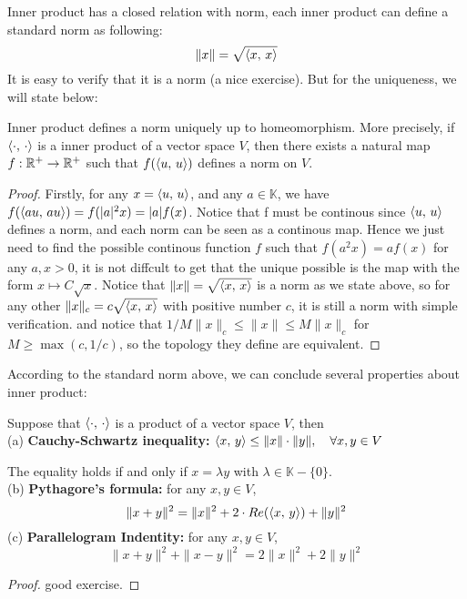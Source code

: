 \documentclass[en,geye,blue,normal,12pt,bibend=bibtex]{elegantnote}
\begin{document}
Inner product has a closed relation with norm, each inner product can define a standard norm as following:
\[\|x\| = \sqrt{\left\langle x,\, x \right\rangle}\]
It is easy to verify that it is a norm (a nice exercise). But for the uniqueness, we will state below:
\begin{proposition}
    Inner product defines a norm uniquely up to homeomorphism. More precisely, if \(\left\langle \cdot,\, \cdot \right\rangle\) is a inner product of a vector space \(V\), then there exists a natural map \(f: \mathbb{R}^+ \to \mathbb{R}^+\) such that \(f(\left\langle u,\, u \right\rangle)\) defines a norm on \(V\).

    \begin{proof}
        Firstly, for any \(x = \left\langle u,\, u \right\rangle\), and any \(a \in \mathbb{K}\), we have \(f(\left\langle au,\, au \right\rangle) = f(|a|^2x) = |a|f(x)\). Notice that f must be continous since \(\left\langle u,\, u \right\rangle\) defines a norm, and each norm can be seen as a continous map. Hence we just need to find the possible continous function \(f\) such that \(f(a^2x)=af(x)\) for any \(a,x >0\), it is not diffcult to get that the unique possible is the map with the form \(x \mapsto C\sqrt{x}\). Notice that \(\|x\| = \sqrt{\left\langle x,\, x \right\rangle}\) is a norm as we state above, so for any other \(\|x\|_c = c\sqrt{\left\langle x,\, x \right\rangle}\) with positive number \(c\), it is still a norm with simple verification. and notice that \(1/M \|x\|_c \leq \|x\| \leq M\|x\|_c\) for \(M \geq \max(c,1/c)\), so the topology they define are equivalent.
    \end{proof}
\end{proposition}

According to the standard norm above, we can conclude several properties about inner product:

\begin{proposition}
    Suppose that \(\left\langle \cdot,\, \cdot \right\rangle\) is a product of a vector space \(V\), then\\
    (a) \textbf{Cauchy-Schwartz inequality:} \(\left\langle x,\, y \right\rangle \leq \|x\|\cdot\|y\|, \quad \forall x, y \in V\)
    
    The equality holds if and only if \(x = \lambda y\) with \(\lambda \in \mathbb{K}-\{0\}\).\\
    (b) \textbf{Pythagore's formula:} for any \(x,y \in V\),
    \[\|x+y\|^2=  \|x\|^2+ 2\cdot Re(\left\langle x,\, y \right\rangle)+ \|y\|^2\]
    (c) \textbf{Parallelogram Indentity:} for any \(x,y \in V\),
    \[\|x+y\|^2 + \|x-y\|^2 = 2\|x\|^2 + 2\|y\|^2\]
    \begin{proof}
        good exercise.
    \end{proof}
\end{proposition}
\end{document}
